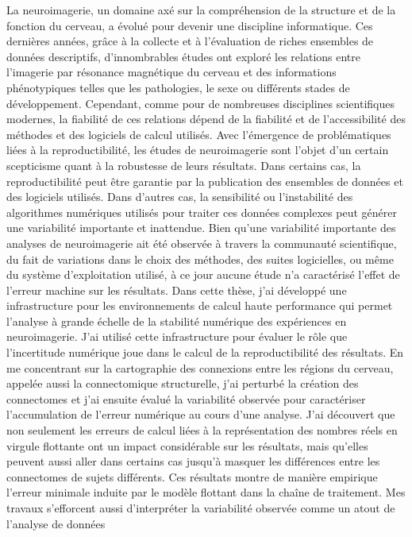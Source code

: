 La neuroimagerie, un domaine axé sur la compréhension de la structure et de la fonction du cerveau, a
évolué pour devenir une discipline informatique. Ces dernières années, grâce à la collecte et à
l'évaluation de riches ensembles de données descriptifs, d'innombrables études ont exploré les
relations entre l'imagerie par résonance magnétique du cerveau et des informations phénotypiques
telles que les pathologies, le sexe ou différents stades de développement. Cependant, comme pour de
nombreuses disciplines scientifiques modernes, la fiabilité de ces relations dépend de la fiabilité
et de l'accessibilité des méthodes et des logiciels de calcul utilisés. Avec l'émergence de
problématiques liées à la reproductibilité, les études de neuroimagerie sont l'objet d'un certain
scepticisme quant à la robustesse de leurs résultats. Dans certains cas, la reproductibilité peut être
garantie par la publication des ensembles de données et des logiciels utilisés. Dans d'autres cas, la
sensibilité ou l'instabilité des algorithmes numériques utilisés pour traiter ces données complexes peut
générer une variabilité importante et inattendue. Bien qu'une variabilité importante des analyses de
neuroimagerie ait été observée à travers la communauté scientifique, du fait de variations dans le choix
des méthodes, des suites logicielles, ou même du système d'exploitation utilisé, à ce jour aucune étude
n'a caractérisé l'effet de l'erreur machine sur les résultats. Dans cette thèse, j'ai développé une
infrastructure pour les environnements de calcul haute performance qui permet l'analyse à grande échelle
de la stabilité numérique des expériences en neuroimagerie. J’ai utilisé cette infrastructure pour
évaluer le rôle que l'incertitude numérique joue dans le calcul de la reproductibilité des résultats. En
me concentrant sur la cartographie des connexions entre les régions du cerveau, appelée aussi la
connectomique structurelle, j'ai perturbé la création des connectomes  et j'ai ensuite évalué la
variabilité observée pour caractériser l'accumulation de l'erreur numérique au cours d'une analyse. J'ai
découvert que non seulement les erreurs de calcul liées à la représentation des nombres réels en virgule
flottante ont un impact considérable sur les résultats, mais qu'elles peuvent aussi aller dans certains
cas jusqu'à masquer les différences entre les connectomes de sujets différents. Ces résultats montre de
manière empirique l'erreur minimale induite par le modèle flottant dans la chaîne de traitement. Mes
travaux s'efforcent aussi d'interpréter la variabilité observée comme un atout de l’analyse de données
